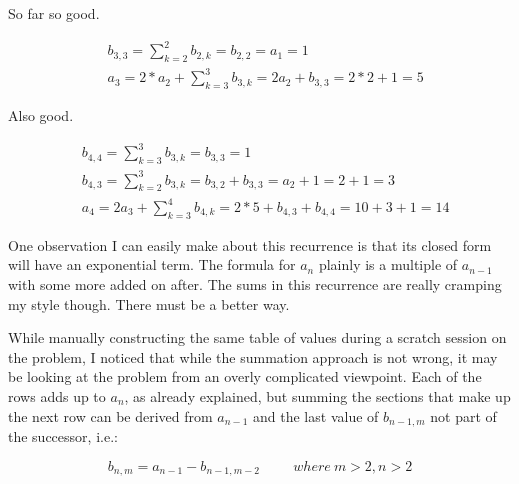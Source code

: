 \documentclass{article}
\begin{document}
So far so good.

\begin{align*}
  &b_{3,3} = \sum_{k=2}^{2} b_{2,k} = b_{2,2} = a_1 = 1 \\
  &a_3 = 2 * a_2 + \sum_{k=3}^{3} b_{3,k} = 2a_2 + b_{3,3} = 2 * 2 + 1 = 5
\end{align*}

Also good.

\begin{align*}
  &b_{4,4} = \sum_{k=3}^{3} b_{3,k} = b_{3,3} = 1 \\
  &b_{4,3} = \sum_{k=2}^{3} b_{3,k} = b_{3,2} + b_{3,3} = a_2 + 1 = 2 + 1 = 3 \\
  &a_4 = 2 a_{3} + \sum_{k=3}^{4} b_{4,k} = 2 * 5 + b_{4,3} + b_{4,4} = 10 + 3 + 1 = 14
\end{align*}

One observation I can easily make about this recurrence is that its closed form will have an exponential term.  The formula for $a_n$ plainly is a multiple of $a_{n-1}$ with some more added on after.  The sums in this recurrence are really cramping my style though.  There must be a better way.

\par

While manually constructing the same table of values during a scratch session on the problem, I noticed that while the summation approach is not wrong, it may be looking at the problem from an overly complicated viewpoint.  Each of the rows adds up to $a_n$, as already explained, but summing the sections that make up the next row can be derived from $a_{n-1}$ and the last value of $b_{n-1,m}$ not part of the successor, i.e.:

\begin{equation}
  b_{n,m} = a_{n-1} - b_{n-1,m-2} \hspace{1cm} where~m>2,n>2
\end{equation}
\end{document}
